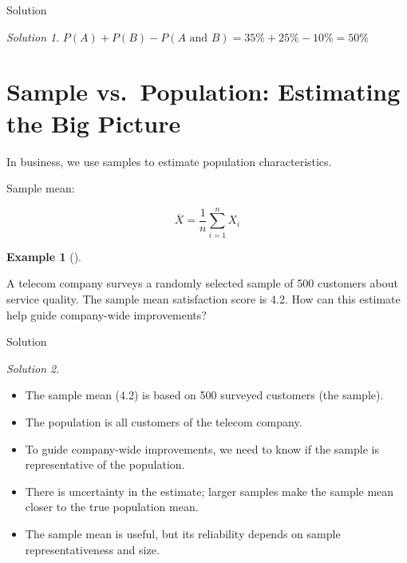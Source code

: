 \documentclass[
  12pt,
  letterpaper,
]{scrbook}
\providecommand{\tightlist}{%
  \setlength{\itemsep}{0pt}\setlength{\parskip}{0pt}}
\renewcommand{\tightlist}{\setlength{\itemsep}{0.5\baselineskip}\setlength{\parskip}{0.2\baselineskip}}
\theoremstyle{plain}
\theoremstyle{definition}
\newtheorem{example}{Example}[chapter]
\theoremstyle{remark}
\newtheorem{refsolution}{Solution}[chapter]
\begin{document}
Solution

\begin{refsolution}
\leavevmode

\(P(A) + P(B) - P(A \text{ and } B) = 35\% + 25\% - 10\% = 50\%\)

\label{sol-2}

\end{refsolution}

\section{Sample vs.~Population: Estimating the Big
Picture}\label{sample-vs.-population-estimating-the-big-picture}

In business, we use samples to estimate population characteristics.

Sample mean:

\[
\overline{X} = \frac{1}{n} \sum_{i=1}^n X_i
\]

\begin{example}[]\protect\hypertarget{exm-telecom}{}\label{exm-telecom}

A telecom company surveys a randomly selected sample of 500 customers
about service quality. The sample mean satisfaction score is 4.2. How
can this estimate help guide company-wide improvements?

\end{example}

Solution

\begin{refsolution}
\leavevmode

\begin{itemize}
\tightlist
\item
  The sample mean (4.2) is based on 500 surveyed customers (the sample).
\item
  The population is all customers of the telecom company.
\item
  To guide company-wide improvements, we need to know if the sample is
  representative of the population.
\item
  There is uncertainty in the estimate; larger samples make the sample
  mean closer to the true population mean.
\item
  The sample mean is useful, but its reliability depends on sample
  representativeness and size.
\end{itemize}

\label{sol-telecom}

\end{refsolution}
\end{document}
